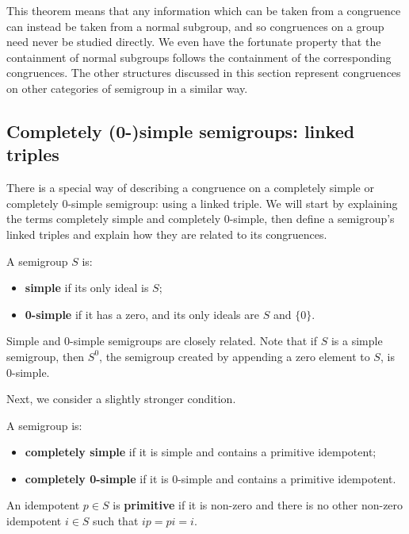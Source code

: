 This theorem means that any information which can be taken from a congruence can
instead be taken from a normal subgroup, and so congruences on a group need
never be studied directly.  We even have the fortunate property that the
containment of normal subgroups follows the containment of the corresponding
congruences.  The other structures discussed in this section represent
congruences on other categories of semigroup in a similar way.



\subsection{Completely (0-)simple semigroups: linked triples}
\label{sec:linked-triples}

There is a special way of describing a congruence on a completely simple or
completely 0-simple semigroup: using a linked triple.  We will start by
explaining the terms completely simple and completely 0-simple, then define a
semigroup's linked triples and explain how they are related to its congruences.

\begin{definition}
  \label{def:zerosimple}
  A semigroup $S$ is:
  \begin{itemize}
  \item \textbf{simple} if its only ideal is $S$;
  \item \textbf{0-simple} if it has a zero, and its only ideals are $S$ and
    $\{0\}$.
  \end{itemize}
\end{definition}

Simple and 0-simple semigroups are closely related.  Note that if $S$ is a
simple semigroup, then $S^0$, the semigroup created by appending a zero element
to $S$, is 0-simple.

Next, we consider a slightly stronger condition.

\begin{definition}
  \label{def:completelyzerosimple}
  A semigroup is:
  \begin{itemize}
  \item \textbf{completely simple} if it is simple and contains a primitive
    idempotent;
  \item \textbf{completely 0-simple} if it is 0-simple and contains a primitive
    idempotent.
  \end{itemize}
  An idempotent $p \in S$ is \textbf{primitive} if it is non-zero and there is
  no other non-zero idempotent $i \in S$ such that $ip = pi = i$.
\end{definition}

